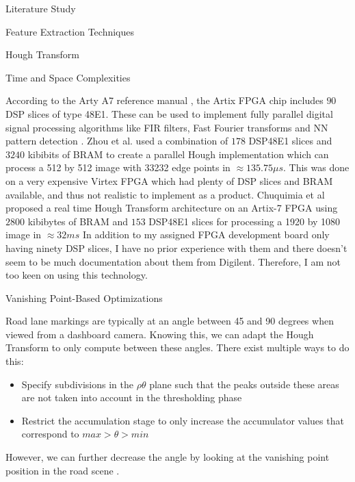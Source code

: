 \documentclass{matthijs}
\begin{document}
\begin{hoofdstuk}{Literature Study}
\begin{paragraaf}{Feature Extraction Techniques}
\begin{subparagraaf}{Hough Transform}
\begin{subsubparagraaf}{Time and Space Complexities}
					\bigskip

					According to the Arty A7 reference manual \cite{digilent2020arty}, the Artix FPGA chip includes $90$ DSP slices of type 48E1.
					These can be used to implement fully parallel digital signal processing algorithms like FIR filters, Fast Fourier transforms and NN pattern detection \cite{xilinx2018series}.
					Zhou et al. \cite{zhou2013efficient} used a combination of $178$ DSP48E1 slices and $3240$ kibibits of BRAM to create a parallel Hough implementation which can process a 512 by 512 image with 33232 edge points in $\approx 135.75 \mu s$.
					This was done on a very expensive Virtex FPGA which had plenty of DSP slices and BRAM available, and thus not realistic to implement as a product.
					Chuquimia et al \cite{chuquimia2018fpga} proposed a real time Hough Transform architecture on an Artix-7 FPGA using $2800$ kibibytes of BRAM and $153$ DSP48E1 slices for processing a 1920 by 1080 image in $\approx 32 ms$
					In addition to my assigned FPGA development board only having ninety DSP slices, I have no prior experience with them and there doesn't seem to be much documentation about them from Digilent.
					Therefore, I am not too keen on using this technology.

				\end{subsubparagraaf}

				\begin{subsubparagraaf}{Vanishing Point-Based Optimizations}

					Road lane markings are typically at an angle between 45 and 90 degrees when viewed from a dashboard camera.
					Knowing this, we can adapt the Hough Transform to only compute between these angles.
					There exist multiple ways to do this:

					\begin{itemize}

						\item Specify subdivisions in the $\rho\theta$ plane such that the peaks outside these areas are not taken into account in the thresholding phase \cite{solberg2009hough}
						\item Restrict the accumulation stage to only increase the accumulator values that correspond to $ max > \theta > min $ \cite{looges1993hough}
					\end{itemize}

					However, we can further decrease the angle by looking at the vanishing point position in the road scene \cite{shang2011lane}.


\end{subsubparagraaf}
\end{subparagraaf}
\end{paragraaf}
\end{hoofdstuk}
\end{document}
